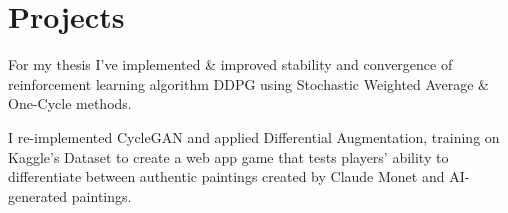 \documentclass[]{CV}
\begin{document}
\begin{minipage}[t]{0.705\textwidth}
\begin{tightemize}
\begin{tightemize}
\end{tightemize}



\section{Projects}
\begin{tightemize}

\item For my thesis I've implemented \& improved stability and convergence of reinforcement learning algorithm DDPG using Stochastic Weighted Average \& One-Cycle methods.

\end{tightemize}

\begin{tightemize}

\item I re-implemented CycleGAN and applied Differential Augmentation, training on Kaggle's Dataset to create a web app game that tests players' ability to differentiate between authentic paintings created by Claude Monet and AI-generated paintings.

\end{tightemize}
\sectionsep








%
%

\end{minipage} 
\end{document}

